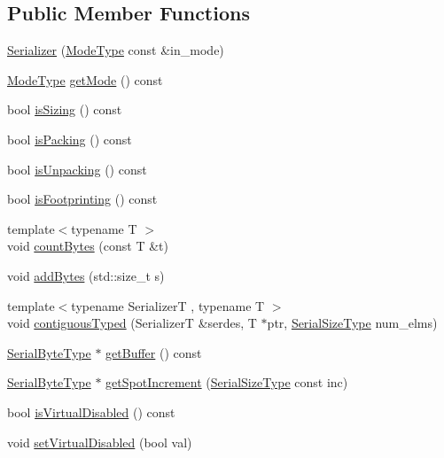 \subsection*{Public Member Functions}
\begin{DoxyCompactItemize}
\item 
\hyperlink{structcheckpoint_1_1_serializer_a4007a463384ec96a4c21bd7f049f0be5}{Serializer} (\hyperlink{namespacecheckpoint_ae2509499ccd8b1dc48fb535bf8aa3059}{Mode\+Type} const \&in\+\_\+mode)
\item 
\hyperlink{namespacecheckpoint_ae2509499ccd8b1dc48fb535bf8aa3059}{Mode\+Type} \hyperlink{structcheckpoint_1_1_serializer_a2b22a87a81fb9ff1b00dd96bbe4debe2}{get\+Mode} () const
\item 
bool \hyperlink{structcheckpoint_1_1_serializer_a27e3304ca8c9de113675b7692e5aa65f}{is\+Sizing} () const
\item 
bool \hyperlink{structcheckpoint_1_1_serializer_aee9d2701f508fff94bad836576443cd9}{is\+Packing} () const
\item 
bool \hyperlink{structcheckpoint_1_1_serializer_a3a09ea026ff2c6ddf863f9c1a6463466}{is\+Unpacking} () const
\item 
bool \hyperlink{structcheckpoint_1_1_serializer_a01f395bfaa39a8311925c71537877378}{is\+Footprinting} () const
\item 
{\footnotesize template$<$typename T $>$ }\\void \hyperlink{structcheckpoint_1_1_serializer_a805ae9ce395614512dfb6b0bd2c22881}{count\+Bytes} (const T \&t)
\item 
void \hyperlink{structcheckpoint_1_1_serializer_a52cd27806c3b821605d723900ec7d2e5}{add\+Bytes} (std\+::size\+\_\+t s)
\item 
{\footnotesize template$<$typename SerializerT , typename T $>$ }\\void \hyperlink{structcheckpoint_1_1_serializer_af2f453fc63424918a16ea6024d576a3e}{contiguous\+Typed} (SerializerT \&serdes, T $\ast$ptr, \hyperlink{namespacecheckpoint_a083f6674da3f94c2901b18c6d238217c}{Serial\+Size\+Type} num\+\_\+elms)
\item 
\hyperlink{namespacecheckpoint_ae57f01cdc0b81776c23b6c7c934c58f5}{Serial\+Byte\+Type} $\ast$ \hyperlink{structcheckpoint_1_1_serializer_a6231bd380e02ee8668e7a6efebca2664}{get\+Buffer} () const
\item 
\hyperlink{namespacecheckpoint_ae57f01cdc0b81776c23b6c7c934c58f5}{Serial\+Byte\+Type} $\ast$ \hyperlink{structcheckpoint_1_1_serializer_af2fc82901c31232b7549b20a8732de30}{get\+Spot\+Increment} (\hyperlink{namespacecheckpoint_a083f6674da3f94c2901b18c6d238217c}{Serial\+Size\+Type} const inc)
\item 
bool \hyperlink{structcheckpoint_1_1_serializer_af45e225cdb3a750a06de80a8cd5c6c37}{is\+Virtual\+Disabled} () const
\item 
void \hyperlink{structcheckpoint_1_1_serializer_af57d7cd51e94dd44a5be184456c2d59f}{set\+Virtual\+Disabled} (bool val)
\end{DoxyCompactItemize}
